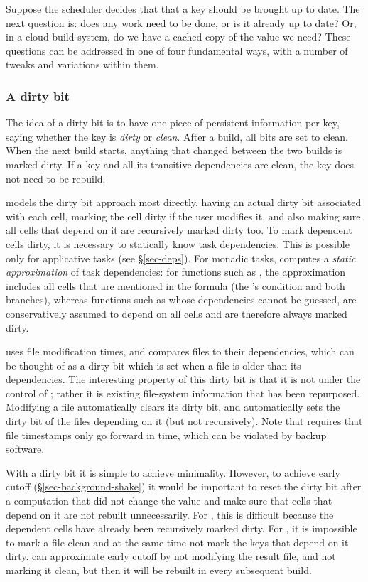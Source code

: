 Suppose the scheduler decides that that a key should be brought up to date. The
next question is: does any work need to be done, or is it already up to date?
Or, in a cloud-build system, do we have a cached copy of the value we need?
These questions can be addressed in one of four fundamental ways, with a number
of tweaks and variations within them.

\vspace{-2mm}
\subsubsection{A dirty bit}\label{sec-dirty-bit}

The idea of a dirty bit is to have one piece of persistent information per key,
saying whether the key is \emph{dirty} or \emph{clean}. After a build, all bits
are set to clean. When the next build starts, anything that changed between the
two builds is marked dirty. If a key and all its transitive dependencies are
clean, the key does not need to be rebuild.

\Excel models the dirty bit approach most directly, having an actual dirty bit
associated with each cell, marking the cell dirty if the user modifies it, and
also making sure all cells that depend on it are recursively marked dirty too.
To mark dependent cells dirty, it is necessary to statically know task
dependencies. This is possible only for applicative tasks (see \S\ref{sec-deps}).
For monadic tasks, \Excel computes a \emph{static approximation} of task
dependencies: for functions such as , the approximation includes all
cells that are mentioned in the formula (the 's condition and both
branches), whereas functions such as  whose dependencies cannot be
guessed, are conservatively assumed to depend on all cells and are therefore
always marked dirty.

\Make uses file modification times, and compares files to their dependencies,
which can be thought of as a dirty bit which is set when a file is older than
its dependencies. The interesting property of this dirty bit is that it is not
under the control of \Make; rather it is existing file-system information that
has been repurposed. Modifying a file automatically clears its dirty bit, and
automatically sets the dirty bit of the files depending on it (but not
recursively). Note that \Make requires that file timestamps only go forward in
time, which can be violated by backup software.

With a dirty bit it is simple to achieve minimality. However, to achieve early
cutoff (\S\ref{sec-background-shake}) it would be important to reset the dirty
bit after a computation that did not change the value and make sure that cells
that depend on it are not rebuilt unnecessarily. For \Excel, this is difficult
because the dependent cells have already been recursively marked dirty. For
\Make, it is impossible to mark a file clean and at the same time not mark the
keys that depend on it dirty. \Make can approximate early cutoff by not
modifying the result file, and not marking it clean, but then it will be rebuilt
in every subsequent build.

